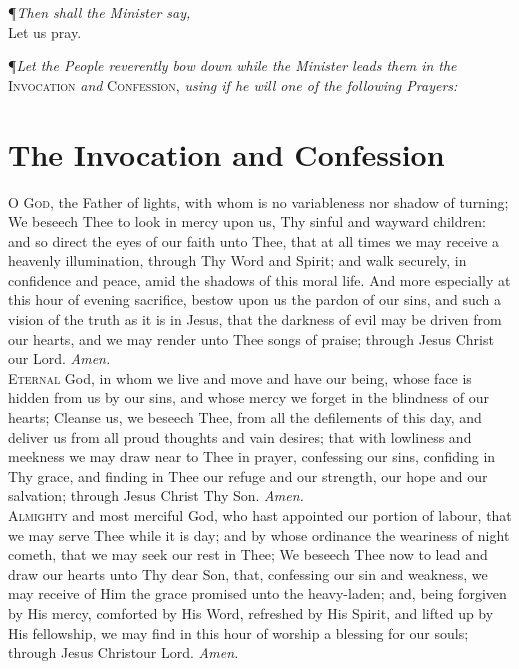 \begin{center}
\P \textit{Then shall the Minister say,} \\
\vspace{1ex}
Let us pray. \\
\vspace{1ex}
\end{center}
\P \textit{Let the People reverently bow down while the Minister leads them in the} \textsc{Invocation} \textit{and} \textsc{Confession,} \textit{using if he will one of the following Prayers:} \\

\section*{The Invocation and Confession}

\lettrine{O}{ God,} the Father of lights, with whom is no variableness nor shadow of turning; We beseech Thee to look in mercy upon us, Thy sinful and wayward children: and so direct the eyes of our faith unto Thee, that at all times we may receive a heavenly illumination, through Thy Word and Spirit; and walk securely, in confidence and peace, amid the shadows of this moral life.
And more especially at this hour of evening sacrifice, bestow upon us the pardon of our sins, and such a vision of the truth as it is in Jesus, that the darkness of evil may be driven from our hearts, and we may render unto Thee songs of praise; through Jesus Christ our Lord.
\textit{Amen.} \\

\noindent\lettrine{E}{ternal} God, in whom we live and move and have our being, whose face is hidden from us by our sins, and whose mercy we forget in the blindness of our hearts; Cleanse us, we beseech Thee, from all the defilements of this day, and deliver us from all proud thoughts and vain desires; that with lowliness and meekness we may draw near to Thee in prayer, confessing our sins, confiding in Thy grace, and finding in Thee our refuge and our strength, our hope and our salvation; through Jesus Christ Thy Son.
\textit{Amen.} \\

\noindent\lettrine{A}{lmighty} and most merciful God, who hast appointed our portion of labour, that we may serve Thee while it is day; and by whose ordinance the weariness of night cometh, that we may seek our rest in Thee; We beseech Thee now to lead and draw our hearts unto Thy dear Son, that, confessing our sin and weakness, we may receive of Him the grace promised unto the heavy-laden; and, being forgiven by His mercy, comforted by His Word, refreshed by His Spirit, and lifted up by His fellowship, we may find in this hour of worship a blessing for our souls; through Jesus Christour Lord.
\textit{Amen.} \\

